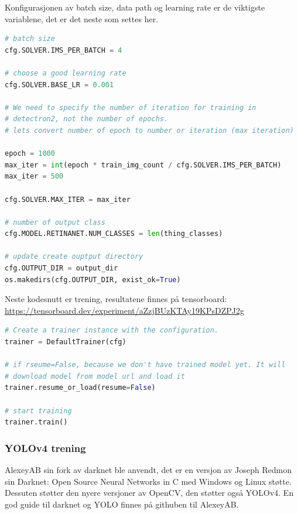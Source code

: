 Konfigurasjonen av batch size, data path og learning rate er de viktigste variablene, det er det neste som settes her. 

\begin{lstlisting}[language=Python, caption=Solver konfigurasjon i train.py]
# batch size
cfg.SOLVER.IMS_PER_BATCH = 4

# choose a good learning rate
cfg.SOLVER.BASE_LR = 0.001

# We need to specify the number of iteration for training in
# detectron2, not the number of epochs.
# lets convert number of epoch to number or iteration (max iteration)

epoch = 1000
max_iter = int(epoch * train_img_count / cfg.SOLVER.IMS_PER_BATCH)
max_iter = 500

cfg.SOLVER.MAX_ITER = max_iter

# number of output class
cfg.MODEL.RETINANET.NUM_CLASSES = len(thing_classes)

# update create ouptput directory
cfg.OUTPUT_DIR = output_dir
os.makedirs(cfg.OUTPUT_DIR, exist_ok=True)

\end{lstlisting}

Neste kodesnutt er trening, resultatene finnes på tensorboard: \\
\url{https://tensorboard.dev/experiment/aZzjBUzKTAy19KPsDZPJ2g}

\begin{lstlisting}[language=Python, caption=Treningskode i train.py]
# Create a trainer instance with the configuration.
trainer = DefaultTrainer(cfg) 

# if rseume=False, because we don't have trained model yet. It will
# download model from model url and load it
trainer.resume_or_load(resume=False)

# start training
trainer.train()

\end{lstlisting}


\subsubsection{YOLOv4 trening}

AlexeyAB sin fork av darknet ble anvendt, det er en versjon av Joseph Redmon sin Darknet: Open Source Neural Networks in C med Windows og Linux støtte. Dessuten støtter den nyere versjoner av OpenCV, den støtter også YOLOv4. En god guide til darknet og YOLO finnes på githuben til AlexeyAB. \cite{AlexeyAB 2020}

